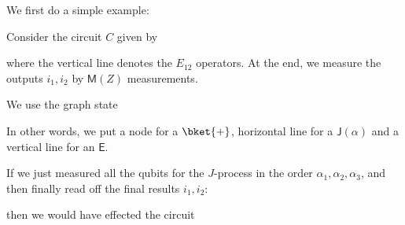 \documentclass[a4paper]{article}
\makeatletter
\newcommand\addMQCstate [3] {
  \pgfmathsetmacro{\x@x}{#3 * 1.5 - 1};
  \node [left] at (0, -#2) {#1};
  \draw (0, -#2) -- (\x@x, -#2);
}
\newcommand\addJ[3]{
  \pgfmathsetmacro{\x@x}{#3 * 1.5 - 0.5};
 \node [draw, rectangle, fill=morange!30!white, minimum height=0.65cm, minimum width=1cm] at (\x@x, -#2) {$\qJ(#1)$};
}
\newcommand\addX[3]{
  \pgfmathsetmacro{\x@x}{#3 * 1.5 - 0.5};
  \node [draw, rectangle, fill=mgreen!30!white, minimum height=0.65cm, minimum width=1cm] at (\x@x, -#2) {$\qX^{#1}$};
}
\newcommand\drawvert[3]{
  \pgfmathsetmacro{\x@x}{#3 * 1.5 - 0.5};
  \draw (\x@x, -#1) node [circ] {} -- (\x@x, -#2) node [circ] {};
}
\newcommand\measurestate[4] {
  \pgfmathsetmacro{\y@y}{-#3 - 0.05};
  \pgfmathsetmacro{\x@x}{#4 + 0.05};
  \draw [-latex'] (\x@x, \y@y) -- +(0.4, -0.4) node [right] {#2};
  \node [above] at (#4, -#3) {#1};
}
\newcommand{\qE}{\mathsf{E}}
\newcommand{\qJ}{\mathsf{J}}
\newcommand{\qM}{\mathsf{M}}
\newcommand{\qX}{\mathsf{X}}
\newcommand{\qZ}{\mathsf{Z}}
\makeatother
\begin{document}
We first do a simple example:
\begin{eg}
  Consider the circuit $C$ given by
  \begin{center}
  \end{center}
  where the vertical line denotes the $E_{12}$ operators. At the end, we measure the outputs $i_1, i_2$ by $\qM(Z)$ measurements.

  We use the graph state
  \begin{center}
  \end{center}
  In other words, we put a node for a $\bket{+}$, horizontal line for a $\qJ(\alpha)$ and a vertical line for an $\qE$.

  If we just measured all the qubits for the $J$-process in the order $\alpha_1, \alpha_2, \alpha_3$, and then finally read off the final results $i_1, i_2$:
  \begin{center}
  \end{center}
  then we would have effected the circuit
  \begin{center}
  \end{center}
\end{eg}
\end{document}
